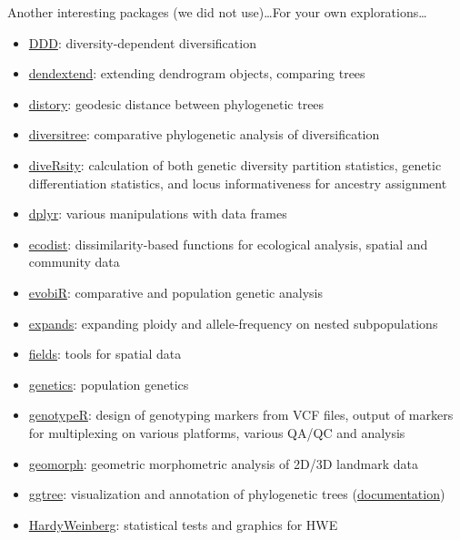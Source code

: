 \documentclass[compress, ucs, xelatex, 11pt, xcolor=svgnames, aspectratio=169,
	hyperref={
		bookmarks=true,
		unicode=true,
		colorlinks=true,
		pdftitle={Molecular data in R},
		plainpages=false,
		pdfauthor={Vojtech Zeisek},
		pdfsubject={Course about phylogeny and evolution in R},
		pdfcreator={XeLaTeX},
		pdfkeywords={R, evolution, phylogeny, molecular data},
		linkcolor=Crimson, %
		anchorcolor=Magenta, %
		citecolor=Magenta, %
		filecolor=Magenta, %
		menucolor=Magenta, %
		urlcolor=DodgerBlue, %
		pdftex},
	url={hyphens, lowtilde} %
	]{beamer}
\begin{document}
\begin{frame}[allowframebreaks]{Another interesting packages (we did not use)\ldots}{For your own explorations\ldots}
\begin{itemize}
		\item \href{https://CRAN.R-project.org/package=DDD}{DDD}: diversity-dependent diversification
		\item \href{https://CRAN.R-project.org/package=dendextend}{dendextend}: extending dendrogram objects, comparing trees
		\item \href{https://CRAN.R-project.org/package=distory}{distory}: geodesic distance between phylogenetic trees
		\item \href{https://CRAN.R-project.org/package=diversitree}{diversitree}: comparative phylogenetic analysis of diversification
		\item \href{https://CRAN.R-project.org/package=diveRsity}{diveRsity}: calculation of both genetic diversity partition statistics, genetic differentiation statistics, and locus informativeness for ancestry assignment
		\item \href{https://CRAN.R-project.org/package=dplyr}{dplyr}: various manipulations with data frames
		\item \href{https://CRAN.R-project.org/package=ecodist}{ecodist}: dissimilarity-based functions for ecological analysis, spatial and community data
		\item \href{https://CRAN.R-project.org/package=evobiR}{evobiR}: comparative and population genetic analysis
		\item \href{https://CRAN.R-project.org/package=expands}{expands}: expanding ploidy and allele-frequency on nested subpopulations
		\item \href{https://CRAN.R-project.org/package=fields}{fields}: tools for spatial data
		\item \href{https://CRAN.R-project.org/package=genetics}{genetics}: population genetics
		\item \href{https://CRAN.R-project.org/package=genotypeR}{genotypeR}: design of genotyping markers from VCF files, output of markers for multiplexing on various platforms, various QA/QC and analysis
		\item \href{https://CRAN.R-project.org/package=geomorph}{geomorph}: geometric morphometric analysis of 2D/3D landmark data
		\item \href{https://bioconductor.org/packages/release/bioc/html/ggtree.html}{ggtree}: visualization and annotation of phylogenetic trees (\href{https://guangchuangyu.github.io/software/ggtree/documentation/}{documentation})
		\item \href{https://CRAN.R-project.org/package=HardyWeinberg}{HardyWeinberg}: statistical tests and graphics for HWE

\end{itemize}
\end{frame}
\end{document}
